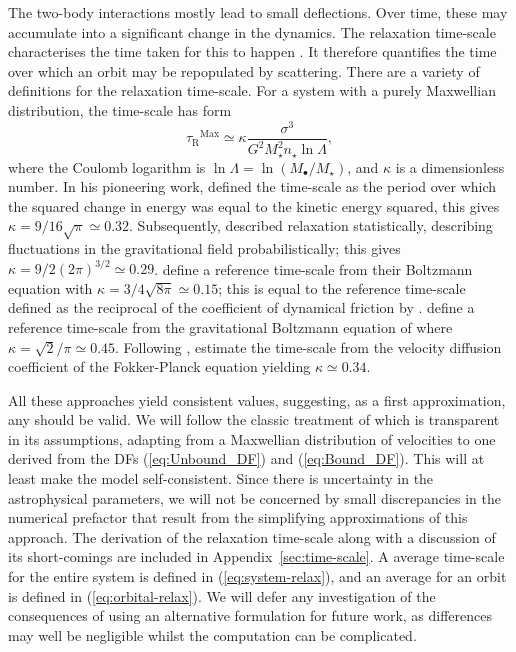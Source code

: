 \documentclass[useAMS,usedcolumn,usegraphicx,usenatbib]{mn2e}
\newcommand{\eqnref}[1]{(\ref{eq:#1})}
\newcommand{\apref}[1]{Appendix~\ref{sec:#1}}
\newcommand{\sub}[1]{\ensuremath{_\mathrm{#1}}}
\newcommand{\super}[1]{\ensuremath{^\mathrm{#1}}}
\begin{document}
The two-body interactions mostly lead to small deflections. Over time, these may accumulate into a significant change in the dynamics. The relaxation time-scale characterises the time taken for this to happen \citep{Binney1987}. It therefore quantifies the time over which an orbit may be repopulated by scattering. There are a variety of definitions for the relaxation time-scale. For a system with a purely Maxwellian distribution, the time-scale has form
\begin{equation}
\tau\sub{R}\super{Max} \simeq \kappa\frac{\sigma^3}{G^2M_\star^2 n_\star\ln\Lambda},
\label{eq:tauMaxwell}
\end{equation}
where the Coulomb logarithm is $\ln\Lambda = \ln(M_\bullet/M_\star)$, and $\kappa$ is a dimensionless number. In his pioneering work, \citet{Chandrasekhar1941, Chandrasekhar1960} defined the time-scale as the period over which the squared change in energy was equal to the kinetic energy squared, this gives $\kappa = 9/16\sqrt{\pi} \simeq 0.32$. Subsequently, \citet{Chandrasekhar1941a} described relaxation statistically, describing fluctuations in the gravitational field probabilistically; this gives $\kappa = 9/2(2\pi)^{3/2} \simeq 0.29$. \citet{Bahcall1977} define a reference time-scale from their Boltzmann equation with $\kappa = 3/4\sqrt{8\pi} \simeq 0.15$; this is equal to the reference time-scale defined as the reciprocal of the coefficient of dynamical friction by \citet{Chandrasekhar1943a, Chandrasekhar1943}. \citet{Spitzer1958} define a reference time-scale from the gravitational Boltzmann equation of \citet{Spitzer1951} where $\kappa = \sqrt{2}/\pi \simeq 0.45$. Following \citet{Spitzer1971}, \citet[section 8.3.4]{Binney1987} estimate the time-scale from the velocity diffusion coefficient of the Fokker-Planck equation yielding $\kappa \simeq 0.34$.

All these approaches yield consistent values, suggesting, as a first approximation, any should be valid. We will follow the classic treatment of \citet[chapter 2]{Chandrasekhar1960} which is transparent in its assumptions, adapting from a Maxwellian distribution of velocities to one derived from the DFs \eqnref{Unbound_DF} and \eqnref{Bound_DF}. This will at least make the model self-consistent. Since there is uncertainty in the astrophysical parameters, we will not be concerned by small discrepancies in the numerical prefactor that result from the simplifying approximations of this approach. The derivation of the relaxation time-scale along with a discussion of its short-comings are included in \apref{time-scale}. A average time-scale for the entire system is defined in \eqnref{system-relax}, and an average for an orbit is defined in \eqnref{orbital-relax}. We will defer any investigation of the consequences of using an alternative formulation for future work, as differences may well be negligible whilst the computation can be complicated.
\end{document}
